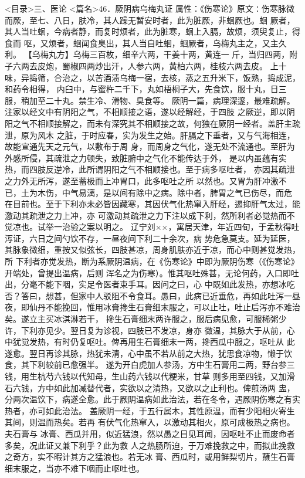 \documentclass[a4paper,12pt,UTF8,twoside]{ctexbook}
\begin{document}
<目录>三、医论
<篇名>46．厥阴病乌梅丸证
属性：《伤寒论》原文∶伤寒脉微而厥，至七、八日，肤冷，其人躁无暂安时者，此为脏厥，非蛔厥也。蛔 
厥者，其人当吐蛔，今病者静，而复时烦者，此为脏寒，蛔上入膈，故烦，须臾复止，得食而 
呕，又烦者，蛔闻食臭出，其人当自吐蛔，蛔厥者，乌梅丸主之，又主久利。 
【乌梅丸方】乌梅三百枚，细辛六两，干姜十两，黄连一 
斤，当归四两，附子六两去皮炮，蜀椒四两炒出汗，人参六两，黄柏六两，桂枝六两去皮。 
上十味，异捣筛，合治之，以苦酒渍乌梅一宿，去核，蒸之五升米下，饭熟，捣成泥，和药令相得， 
内臼中，与蜜杵二千下，丸如梧桐子大，先食饮，服十丸，日三服，稍加至二十丸。禁生冷、滑物、臭食等。 
厥阴一篇，病理深邃，最难疏解。注家以经文中有阴阳之气，不相顺接之语，遂以经解经，于四肢 
之厥逆，即以阴阳之气不相顺接解之，而未有深究其不相顺接之故，何独在厥阴一经者。盖肝主疏泄，原为风木 
之脏，于时应春，实为发生之始。肝膈之下垂者，又与气海相连，故能宣通先天之元气，以敷布于周 
身，而周身之气化，遂无处不流通也。至肝为外感所侵，其疏泄之力顿失，致脏腑中之气化不能传达于外， 
是以内虽蕴有实热，而四肢反逆冷，此所谓阴阳之气不相顺接也。至于病多呕吐者， 
亦因其疏泄之力外无所泻，遂至蓄极而上冲胃口，此多呕吐之所 
以然也。又胃为肝冲激不已，土为木伤，中气易漓，是以间有除中之病。除中者，脾胃之气已伤尽，而危 
在目前也。至于下利亦未必皆因藏寒，其因伏气化热窜入肝经，遏抑肝气太过，能激动其疏泄之力上冲，亦 
可激动其疏泄之力下注以成下利，然所利者必觉热而不觉凉也。试举一治验之案以明之。 
辽宁刘××，寓居天津，年近四旬，于孟秋得吐泻证，六日之间勺饮不存，一昼夜间下利二十余次，病 
势危急莫支。延为延医，其脉象微细，重按又似弦长，四肢甚凉，周身肌肤亦近于凉，而心中则甚觉发热，所 
下利者亦觉发热，断为系厥阴温病，在《伤寒论》中即为厥阴伤寒（《伤寒论》开端处，曾提出温病，后则 
浑名之为伤寒）。惟其呕吐殊甚，无论何药，入口即吐出，分毫不能下咽，实足令医者束手耳。因问之曰，心 
中既如此发热，亦想冰吃否？答曰，想甚，但家中人驳阻不令食耳。愚曰，此病已近垂危，再如此吐泻一昼 
夜，即仙丹不能挽回，惟用冰膏搀生石膏细末服之，可以止吐，吐止后泻亦不难治矣。遂立主买冰淇淋若干， 
搀生石膏细末两许服之，服后病见愈，可服稀粥少许，下利亦见少。翌日复为诊视，四肢已不发凉，身亦 
微温，其脉大于从前，心中犹觉发热，有时仍复呕吐。俾再用生石膏细末一两，搀西瓜中服之，呕吐从 
此遂愈。翌日再诊其脉，热犹未清，心中虽不若从前之大热，犹思食凉物，懒于饮食，其下利较前已愈强半。 
遂为开白虎加人参汤，方中生石膏用二两，野台参三钱，用生杭芍六钱以代知母，生山药六钱以代粳米，甘草 
则多用至四钱，又加滑石六钱，方中如此加减替代者，实欲以之清热，又欲以之止利也。俾煎汤两 
盅，分两次温饮下，病遂全愈。此于厥阴温病如此治法，若在冬令，遇厥阴伤寒之有实热者，亦可如此治法。 
盖厥阴一经，于五行属木，其性原温，而有少阳相火寄生其间，则温而热矣。若再 
有伏气化热窜入，以激动其相火，原可成极热之病也。夫石膏与 
冰膏、西瓜并用，似近猛浪，然以愚之目见耳闻，因呕吐不止而废命者多矣，况此证又兼下利乎？此为救 
人之热肠所迫，于万难挽救之中，而拟此挽救之奇方，实不暇计其方之猛浪也。若无冰 
膏、西瓜时，或用鲜梨切片，蘸生石膏细末服之，当亦不难下咽而止呕吐也。 
\end{document}
